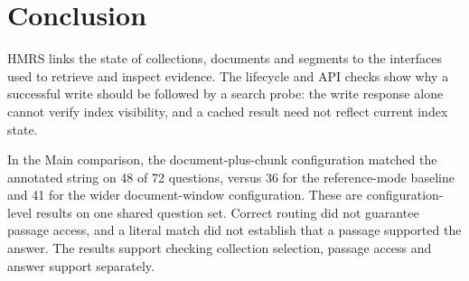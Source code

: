 \section{Conclusion}
\label{sec:conclusion}

HMRS links the state of collections, documents and segments to the
interfaces used to retrieve and inspect evidence. The lifecycle
and API checks show why a successful write should be followed by a search
probe: the write response alone cannot verify index visibility, and a
cached result need not reflect current index state.

In the Main comparison, the document-plus-chunk configuration matched the
annotated string on 48 of 72 questions, versus 36 for the reference-mode
baseline and 41 for the wider document-window configuration. These are
configuration-level results on one shared question set. Correct routing did
not guarantee passage access, and a literal match did not establish that a
passage supported the answer. The results support checking collection
selection, passage access and answer support separately.
